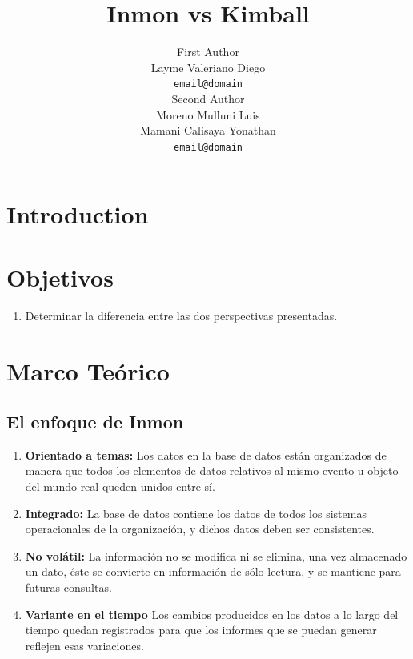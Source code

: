 \documentclass[11pt]{article}
\title{Inmon vs Kimball}
\author{First Author \\
    Layme Valeriano Diego \\
  {\tt email@domain} \\\And
  Second Author \\
    Moreno Mulluni Luis \\
    Mamani Calisaya Yonathan \\
  {\tt email@domain} \\}
\date{}
\begin{document}
\maketitle
\begin{abstract}
    
\end{abstract}


\section{Introduction}


\section{Objetivos}
\begin{enumerate}
    \item Determinar la diferencia entre las dos perspectivas presentadas.
\end{enumerate}


\section{Marco Teórico}

\subsection{El enfoque de Inmon}

\begin{enumerate}
    \item \textbf{Orientado a temas:} Los datos en la base de datos están organizados de manera que todos los elementos de datos relativos al mismo evento u objeto del mundo real queden unidos entre sí.
    \item \textbf{Integrado:} La base de datos contiene los datos de todos los sistemas operacionales de la organización, y dichos datos deben ser consistentes. 
\item \textbf{No volátil:} La información no se modifica ni se elimina, una vez almacenado un dato, éste se convierte en información de sólo lectura, y se mantiene para futuras consultas.

\item \textbf{Variante en el tiempo} Los cambios producidos en los datos a lo largo del tiempo quedan registrados para que los informes que se puedan generar reflejen esas variaciones.

\end{enumerate}
\end{document}
